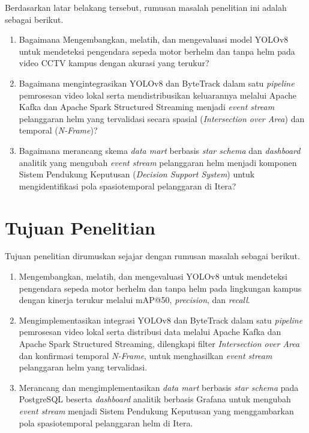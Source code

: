 Berdasarkan latar belakang tersebut, rumusan masalah penelitian ini adalah
sebagai berikut.

\begin{enumerate}
  \item Bagaimana Mengembangkan, melatih, dan mengevaluasi model YOLOv8 untuk mendeteksi pengendara sepeda motor berhelm dan tanpa helm pada video CCTV kampus dengan akurasi yang terukur?

  \item Bagaimana mengintegrasikan YOLOv8 dan ByteTrack dalam satu \textit{pipeline} pemrosesan video lokal serta mendistribusikan keluarannya melalui Apache Kafka dan Apache Spark Structured Streaming menjadi \textit{event stream} pelanggaran helm yang tervalidasi secara spasial (\textit{Intersection over Area}) dan temporal (\textit{N-Frame})?

  \item Bagaimana merancang skema \textit{data mart} berbasis \textit{star schema} dan \textit{dashboard} analitik yang mengubah \textit{event stream} pelanggaran helm menjadi komponen Sistem Pendukung Keputusan (\textit{Decision Support System}) untuk mengidentifikasi pola spasiotemporal pelanggaran di Itera?
\end{enumerate}

\section{Tujuan Penelitian}
\label{section:tujuanpenelitian}

Tujuan penelitian dirumuskan sejajar dengan rumusan masalah sebagai berikut.

\begin{enumerate}
  \item Mengembangkan, melatih, dan mengevaluasi YOLOv8 untuk mendeteksi pengendara sepeda motor berhelm dan tanpa helm pada lingkungan kampus dengan kinerja terukur melalui mAP@50, \textit{precision}, dan \textit{recall}.

  \item Mengimplementasikan integrasi YOLOv8 dan ByteTrack dalam satu \textit{pipeline} pemrosesan video lokal serta distribusi data melalui Apache Kafka dan Apache Spark Structured Streaming, dilengkapi filter \textit{Intersection over Area} dan konfirmasi temporal \textit{N-Frame}, untuk menghasilkan \textit{event stream} pelanggaran helm yang tervalidasi.

  \item Merancang dan mengimplementasikan \textit{data mart} berbasis \textit{star schema} pada PostgreSQL beserta \textit{dashboard} analitik berbasis Grafana untuk mengubah \textit{event stream} menjadi Sistem Pendukung Keputusan yang menggambarkan pola spasiotemporal pelanggaran helm di Itera.
\end{enumerate}

